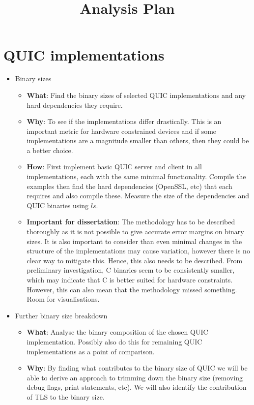 \documentclass[a4paper,11pt]{article}
\title{Analysis Plan}
\begin{document}
\maketitle

\section*{QUIC implementations}

\begin{itemize}
    \item Binary sizes
        \begin{itemize}
            \item \textbf{What}: Find the binary sizes of selected QUIC implementations and any hard dependencies they require.
            \item \textbf{Why}: To see if the implementations differ drastically. This is an important metric for hardware constrained devices and if some implementations are a magnitude smaller than others, then they could be a better choice.
            \item \textbf{How}: First implement basic QUIC server and client in all implementations, each with the same minimal functionality. Compile the examples then find the hard dependencies (OpenSSL, etc) that each requires and also compile these. Measure the size of the dependencies and QUIC binaries using $ls$.
            \item \textbf{Important for dissertation}: The methodology has to be described thoroughly as it is not possible to give accurate error margins on binary sizes. It is also important to consider than even minimal changes in the structure of the implementations may cause variation, however there is no clear way to mitigate this. Hence, this also needs to be described. From preliminary investigation, C binaries seem to be consistently smaller, which may indicate that C is better suited for hardware constraints. However, this can also mean that the methodology missed something. Room for visualisations.
        \end{itemize}
    \item Further binary size breakdown
        \begin{itemize}
            \item \textbf{What}: Analyse the binary composition of the chosen QUIC implementation. Possibly also do this for remaining QUIC implementations as a point of comparison.
            \item \textbf{Why}: By finding what contributes to the binary size of QUIC we will be able to derive an approach to trimming down the binary size (removing debug flags, print statements, etc). We will also identify the contribution of TLS to the binary size.

\end{itemize}
\end{itemize}
\end{document}

